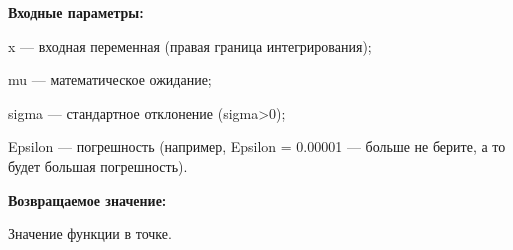 \textbf{Входные параметры:}

 x --- входная переменная (правая граница интегрирования);
 
mu --- математическое ожидание;
 
sigma --- стандартное отклонение (sigma>0);
 
Epsilon --- погрешность (например, Epsilon = 0.00001 --- больше не берите, а то будет большая погрешность).

\textbf{Возвращаемое значение:}

 Значение функции в точке.
 

